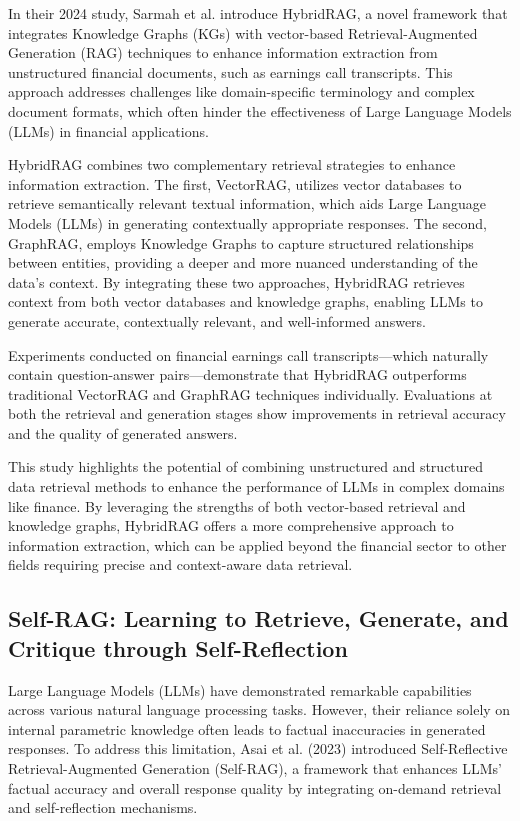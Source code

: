 \noindent In their 2024 study, Sarmah et al. introduce HybridRAG, a novel framework that integrates Knowledge Graphs (KGs) with vector-based Retrieval-Augmented Generation (RAG) techniques to enhance information extraction from unstructured financial documents, such as earnings call transcripts. This approach addresses challenges like domain-specific terminology and complex document formats, which often hinder the effectiveness of Large Language Models (LLMs) in financial applications.

HybridRAG combines two complementary retrieval strategies to enhance information extraction. The first, VectorRAG, utilizes vector databases to retrieve semantically relevant textual information, which aids Large Language Models (LLMs) in generating contextually appropriate responses. The second, GraphRAG, employs Knowledge Graphs to capture structured relationships between entities, providing a deeper and more nuanced understanding of the data's context. By integrating these two approaches, HybridRAG retrieves context from both vector databases and knowledge graphs, enabling LLMs to generate accurate, contextually relevant, and well-informed answers.

Experiments conducted on financial earnings call transcripts—which naturally contain question-answer pairs—demonstrate that HybridRAG outperforms traditional VectorRAG and GraphRAG techniques individually. Evaluations at both the retrieval and generation stages show improvements in retrieval accuracy and the quality of generated answers.

This study highlights the potential of combining unstructured and structured data retrieval methods to enhance the performance of LLMs in complex domains like finance. By leveraging the strengths of both vector-based retrieval and knowledge graphs, HybridRAG offers a more comprehensive approach to information extraction, which can be applied beyond the financial sector to other fields requiring precise and context-aware data retrieval.


\subsection{Self-RAG: Learning to Retrieve, Generate, and Critique through Self-Reflection}

\noindent Large Language Models (LLMs) have demonstrated remarkable capabilities across various natural language processing tasks. However, their reliance solely on internal parametric knowledge often leads to factual inaccuracies in generated responses. To address this limitation, Asai et al. (2023) introduced Self-Reflective Retrieval-Augmented Generation (Self-RAG), a framework that enhances LLMs' factual accuracy and overall response quality by integrating on-demand retrieval and self-reflection mechanisms.

